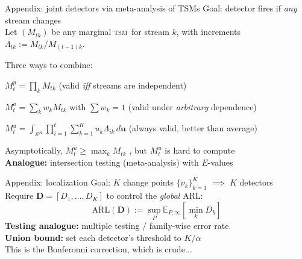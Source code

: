 \documentclass[10pt,aspectratio=169]{beamer}
\newcommand{\E}{\mathbb{E}}
\newcommand{\TSM}{\textsc{tsm}}
\newcommand{\ARL}{\ensuremath{\mathrm{ARL}}}
\newcommand{\bs}{\boldsymbol}
\begin{document}
\begin{frame}{Appendix: joint detectors via meta-analysis of TSMs}
  \alert{Goal}: detector fires if \emph{any} stream changes \\ 
  \medskip
  Let $(M_{tk})$ be any marginal \TSM\ for stream $k$, with increments $\Lambda_{tk} := M_{tk} / M_{(t-1)k}$.
  \medskip
  \begin{block}{Three ways to combine:}
    \begin{description}[align = left]
      \item[\textbf{Product}] $M_t^p = \prod_k M_{tk}$ \hfill (valid \emph{iff} streams are independent)
      \item[\textbf{Average}] $M_t^a = \sum_k w_k M_{tk}$ with $\sum w_k = 1$  \hfill (valid under \emph{arbitrary} dependence)
      \item[~~~~\textbf{Universal portfolio}] $M_t^u = \int_{\mathcal{S}^K} \prod_{i=1}^t \sum_{k=1}^K u_k \Lambda_{ik}\,d{\bs{u}}$ \hfill (always valid, better than average)
    \end{description}
  \end{block}
  \medskip
  Asymptotically, $M_t^u \geq \max_k M_{tk}$ \citep{cover1991}, but $M_t^u$ is hard to compute\\
  \medskip
  \textbf{Analogue:} intersection testing (meta-analysis) with $E$-values \citep{vovkWang2021}
  \medskip
\end{frame}



\begin{frame}{Appendix: localization}
 \alert{Goal}: $K$ change points $\{\nu_k\}_{k=1}^K$ $\implies$ $K$ detectors  \\ 
    \medskip
   Require $\bm{D} = [D_1, \ldots, D_K]$ to control the \emph{global} \ARL:
  \[
    \ARL(\bm{D}) := \sup_{P}\E_{P,\infty}\!\left[\min_k D_k\right]
  \]
  \medskip
  \textbf{Testing analogue:} multiple testing / family-wise error rate. \\
  \medskip 
   \textbf{Union bound:} set each detector's threshold to $K/\alpha$\\
   \medskip
   This is the Bonferonni correction, which is crude...
\end{frame}
\end{document}

